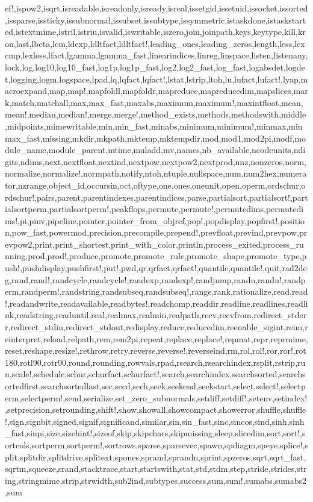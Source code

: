 {ef!,ispow2,isqrt,isreadable,isreadonly,isready,isreal,issetgid,issetuid,issocket,issorted,issparse,issticky,issubnormal,issubset,issubtype,issymmetric,istaskdone,istaskstarted,istextmime,istril,istriu,isvalid,iswritable,iszero,join,joinpath,keys,keytype,kill,kron,last,lbeta,lcm,ldexp,ldltfact,ldltfact!,leading_ones,leading_zeros,length,less,lexcmp,lexless,lfact,lgamma,lgamma_fast,linearindices,linreg,linspace,listen,listenany,lock,log,log10,log10_fast,log1p,log1p_fast,log2,log2_fast,log_fast,logabsdet,logdet,logging,logm,logspace,lpad,lq,lqfact,lqfact!,lstat,lstrip,ltoh,lu,lufact,lufact!,lyap,macroexpand,map,map!,mapfoldl,mapfoldr,mapreduce,mapreducedim,mapslices,mark,match,matchall,max,max_fast,maxabs,maximum,maximum!,maxintfloat,mean,mean!,median,median!,merge,merge!,method_exists,methods,methodswith,middle,midpoints,mimewritable,min,min_fast,minabs,minimum,minimum!,minmax,minmax_fast,missing,mkdir,mkpath,mktemp,mktempdir,mod,mod1,mod2pi,modf,module_name,module_parent,mtime,muladd,mv,names,nb_available,ncodeunits,ndigits,ndims,next,nextfloat,nextind,nextpow,nextpow2,nextprod,nnz,nonzeros,norm,normalize,normalize!,normpath,notify,ntoh,ntuple,nullspace,num,num2hex,numerator,nzrange,object_id,occursin,oct,oftype,one,ones,oneunit,open,operm,ordschur,ordschur!,pairs,parent,parentindexes,parentindices,parse,partialsort,partialsort!,partialsortperm,partialsortperm!,peakflops,permute,permute!,permutedims,permutedims!,pi,pinv,pipeline,pointer,pointer_from_objref,pop!,popdisplay,popfirst!,position,pow_fast,powermod,precision,precompile,prepend!,prevfloat,prevind,prevpow,prevpow2,print,print_shortest,print_with_color,println,process_exited,process_running,prod,prod!,produce,promote,promote_rule,promote_shape,promote_type,push!,pushdisplay,pushfirst!,put!,pwd,qr,qrfact,qrfact!,quantile,quantile!,quit,rad2deg,rand,rand!,randcycle,randcycle!,randexp,randexp!,randjump,randn,randn!,randperm,randperm!,randstring,randsubseq,randsubseq!,range,rank,rationalize,read,read!,readandwrite,readavailable,readbytes!,readchomp,readdir,readline,readlines,readlink,readstring,readuntil,real,realmax,realmin,realpath,recv,recvfrom,redirect_stderr,redirect_stdin,redirect_stdout,redisplay,reduce,reducedim,reenable_sigint,reim,reinterpret,reload,relpath,rem,rem2pi,repeat,replace,replace!,repmat,repr,reprmime,reset,reshape,resize!,rethrow,retry,reverse,reverse!,reverseind,rm,rol,rol!,ror,ror!,rot180,rotl90,rotr90,round,rounding,rowvals,rpad,rsearch,rsearchindex,rsplit,rstrip,run,scale!,schedule,schur,schurfact,schurfact!,search,searchindex,searchsorted,searchsortedfirst,searchsortedlast,sec,secd,sech,seek,seekend,seekstart,select,select!,selectperm,selectperm!,send,serialize,set_zero_subnormals,setdiff,setdiff!,setenv,setindex!,setprecision,setrounding,shift!,show,showall,showcompact,showerror,shuffle,shuffle!,sign,signbit,signed,signif,significand,similar,sin,sin_fast,sinc,sincos,sind,sinh,sinh_fast,sinpi,size,sizehint!,sizeof,skip,skipchars,skipmissing,sleep,slicedim,sort,sort!,sortcols,sortperm,sortperm!,sortrows,sparse,sparsevec,spawn,spdiagm,speye,splice!,split,splitdir,splitdrive,splitext,spones,sprand,sprandn,sprint,spzeros,sqrt,sqrt_fast,sqrtm,squeeze,srand,stacktrace,start,startswith,stat,std,stdm,step,stride,strides,string,stringmime,strip,strwidth,sub2ind,subtypes,success,sum,sum!,sumabs,sumabs2,sum}
